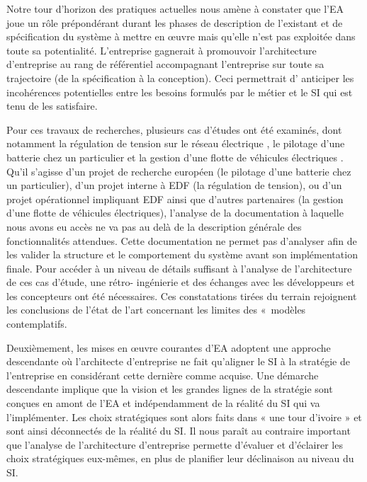 Notre tour d'horizon des pratiques actuelles nous amène à constater que l'EA
joue un rôle prépondérant durant les phases de description de l'existant et de
spécification du système à mettre en œuvre mais qu'elle n'est pas exploitée dans
toute sa potentialité. L'entreprise gagnerait à promouvoir l'architecture
d'entreprise au rang de référentiel accompagnant l'entreprise sur toute sa
trajectoire (de la spécification à la conception). Ceci permettrait d' anticiper
les incohérences potentielles entre les besoins formulés par le métier et le SI
qui est tenu de les satisfaire.

Pour ces travaux de recherches, plusieurs cas d'études ont été examinés,
dont notamment la régulation de tension sur le réseau électrique
\cite{seghiri2014simulation}, le pilotage d'une batterie chez un particulier
\cite{seghiri2012animation} et la gestion d'une flotte de véhicules électriques
\cite{seghiri2015simulation}. Qu'il s'agisse d'un projet de recherche européen
(le pilotage d'une batterie chez un particulier), d'un projet interne à EDF (la
régulation de tension), ou d'un projet opérationnel impliquant EDF ainsi que
d'autres partenaires (la gestion d'une flotte de véhicules électriques),
l'analyse de la documentation à laquelle nous avons eu accès ne va pas au delà
de la description générale des fonctionnalités attendues. Cette documentation
ne permet pas d'analyser afin de les valider la structure et le comportement du
système avant son implémentation finale. Pour accéder à un niveau de détails
suffisant à l'analyse de l'architecture de ces cas d'étude, une rétro-
ingénierie et des échanges avec les développeurs et les concepteurs ont été
nécessaires. Ces constatations tirées du terrain rejoignent les conclusions de
l'état de l'art concernant les limites des «~modèles contemplatifs.

Deuxièmement, les mises en œuvre courantes d'EA adoptent une approche
descendante où l'architecte d'entreprise ne fait qu'aligner le SI à la stratégie
de l'entreprise en considérant cette dernière comme acquise. Une démarche
descendante implique que la vision et les grandes lignes de la stratégie sont
conçues en amont de l'EA et indépendamment de la réalité du SI qui va
l'implémenter. Les choix stratégiques sont alors faits dans « une tour d'ivoire
» et sont ainsi déconnectés de la réalité du SI. Il nous paraît au contraire
important que l'analyse de l'architecture d'entreprise permette d'évaluer et
d'éclairer les choix stratégiques eux-mêmes, en plus de planifier leur
déclinaison au niveau du SI.

